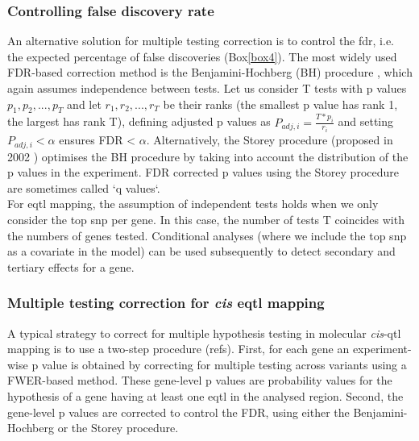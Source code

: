 \subsubsection{Controlling false discovery rate}

An alternative solution for multiple testing correction is to control the \gls{fdr}, i.e. the expected percentage of false discoveries (Box\ref{box4}).
The most widely used FDR-based correction method is the Benjamini-Hochberg (BH) procedure \cite{benjamini1995controlling}, which again assumes independence between tests. 
Let us consider T tests with p values $p_1, p_2, ..., p_T$ and let $r_1, r_2, ..., r_T$ be their ranks (the smallest p value has rank 1, the largest has rank T), defining adjusted p values as $P_{adj,i} = \frac{T*p_i}{r_i} $ and setting $P_{adj,i} <\alpha$ ensures FDR < $\alpha$.
Alternatively, the Storey procedure (proposed in 2002 \cite{storey2002direct}) optimises the BH procedure by taking into account the distribution of the p values in the experiment.
FDR corrected p values using the Storey procedure are sometimes called `q values`.\\


For e\gls{qtl} mapping, the assumption of independent tests holds when we only consider the top \gls{snp} per gene.
In this case, the number of tests T coincides with the numbers of genes tested.
Conditional analyses (where we include the top \gls{snp} as a covariate in the model) can be used subsequently to detect secondary and tertiary effects for a gene.

\subsubsection{Multiple testing correction for \textit{cis} e\gls{qtl} mapping}

A typical strategy to correct for multiple hypothesis testing in molecular \textit{cis}-\gls{qtl} mapping is to use a two-step procedure \cite{gtex2015genotype} (refs). 
First, for each gene an experiment-wise p value is obtained by correcting for multiple testing across variants using a FWER-based method. 
These gene-level p values are probability values for the hypothesis of a gene having at least
one e\gls{qtl} in the analysed region. 
Second, the gene-level p values are corrected to control the FDR, using either the Benjamini-Hochberg or the Storey procedure.\\


